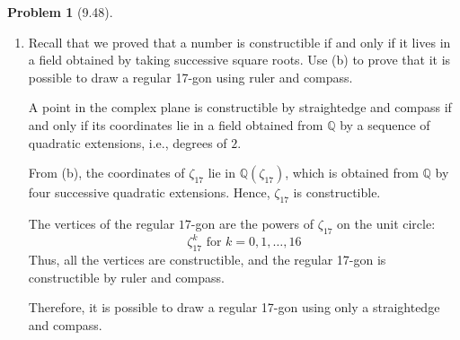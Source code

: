 \documentclass[12pt]{article}
\theoremstyle{definition}
\newtheorem{problem}{Problem}
\begin{document}
\begin{problem}[9.48]
\begin{enumerate}[label=(\alph*)]
        \item Recall that we proved that a number is constructible if and only if it lives in a field obtained by taking successive square roots.
              Use (b) to prove that it is possible to draw a regular 17-gon using ruler and compass.
        
        \begin{solution}
            A point in the complex plane is constructible by straightedge and compass if and only if its coordinates lie in a field obtained from $\mathbb{Q}$ by a sequence of quadratic extensions, i.e., degrees of $2$.

            From (b), the coordinates of $\zeta_{17}$ lie in $\mathbb{Q}(\zeta_{17})$, which is obtained from $\mathbb{Q}$ by four successive quadratic extensions. Hence, $\zeta_{17}$ is constructible.

            The vertices of the regular $17$-gon are the powers of $\zeta_{17}$ on the unit circle:
            \[
                \zeta_{17}^k \text{ for } k = 0, 1, \ldots, 16
            \]
            Thus, all the vertices are constructible, and the regular 17-gon is constructible by ruler and compass.

            Therefore, it is possible to draw a regular 17-gon using only a straightedge and compass.
        \end{solution}
    \end{enumerate}
\end{problem}
\end{document}
